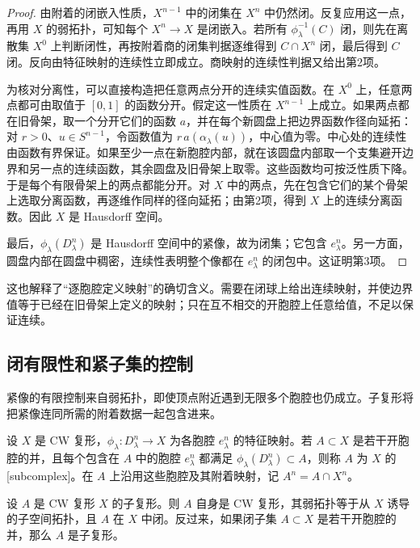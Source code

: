 \begin{proof}
	由附着的闭嵌入性质，\(X^{n-1}\) 中的闭集在 \(X^n\) 中仍然闭。反复应用这一点，再用 \(X\) 的弱拓扑，可知每个 \(X^n\to X\) 是闭嵌入。若所有 \(\phi_\lambda^{-1}(C)\) 闭，则先在离散集 \(X^0\) 上判断闭性，再按附着商的闭集判据逐维得到 \(C\cap X^n\) 闭，最后得到 \(C\) 闭。反向由特征映射的连续性立即成立。商映射的连续性判据又给出第2项。

	为核对分离性，可以直接构造把任意两点分开的连续实值函数。在 \(X^0\) 上，任意两点都可由取值于 \([0,1]\) 的函数分开。假定这一性质在 \(X^{n-1}\) 上成立。如果两点都在旧骨架，取一个分开它们的函数 \(a\)，并在每个新圆盘上把边界函数作径向延拓：对 \(r>0\)、\(u\in S^{n-1}\)，令函数值为 \(r\,a(\alpha_\lambda(u))\)，中心值为零。中心处的连续性由函数有界保证。如果至少一点在新胞腔内部，就在该圆盘内部取一个支集避开边界和另一点的连续函数，其余圆盘及旧骨架上取零。这些函数均可按泛性质下降。于是每个有限骨架上的两点都能分开。对 \(X\) 中的两点，先在包含它们的某个骨架上选取分离函数，再逐维作同样的径向延拓；由第2项，得到 \(X\) 上的连续分离函数。因此 \(X\) 是 Hausdorff 空间。

	最后，\(\phi_\lambda(D^n_\lambda)\) 是 Hausdorff 空间中的紧像，故为闭集；它包含 \(e^n_\lambda\)。另一方面，圆盘内部在圆盘中稠密，连续性表明整个像都在 \(e^n_\lambda\) 的闭包中。这证明第3项。
\end{proof}

这也解释了“逐胞腔定义映射”的确切含义。需要在闭球上给出连续映射，并使边界值等于已经在旧骨架上定义的映射；只在互不相交的开胞腔上任意给值，不足以保证连续。

\subsection{闭有限性和紧子集的控制}
\label{g2:subsec:0103:02}
紧像的有限控制来自弱拓扑，即使顶点附近遇到无限多个胞腔也仍成立。子复形将把紧像连同所需的附着数据一起包含进来。

\begin{definition}
	\label{g2:def:cw-subcomplex}
	设 \(X\) 是 CW 复形，\(\phi_\lambda:D^n_\lambda\to X\) 为各胞腔 \(e^n_\lambda\) 的特征映射。若 \(A\subset X\) 是若干开胞腔的并，且每个包含在 \(A\) 中的胞腔 \(e^n_\lambda\) 都满足 \(\phi_\lambda(D^n_\lambda)\subset A\)，则称 \(A\) 为 \(X\) 的[subcomplex]。在 \(A\) 上沿用这些胞腔及其附着映射，记 \(A^n=A\cap X^n\)。
\end{definition}

\begin{proposition}
	\label{g2:prop:subcomplex-closed}
	设 \(A\) 是 CW 复形 \(X\) 的子复形。则 \(A\) 自身是 CW 复形，其弱拓扑等于从 \(X\) 诱导的子空间拓扑，且 \(A\) 在 \(X\) 中闭。反过来，如果闭子集 \(A\subset X\) 是若干开胞腔的并，那么 \(A\) 是子复形。
\end{proposition}

